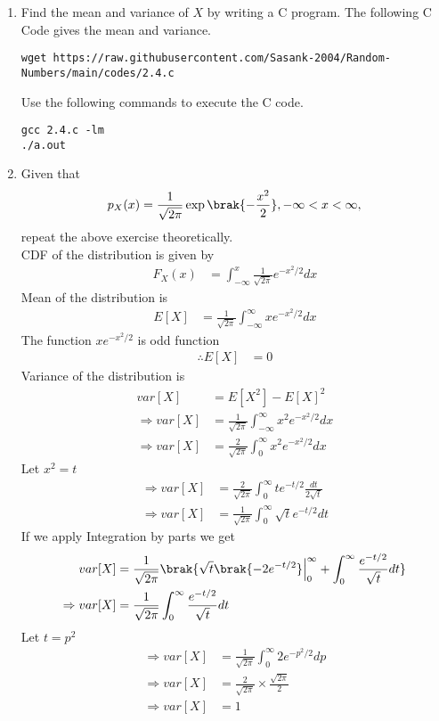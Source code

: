 \documentclass[journal,12pt,twocolumn]{IEEEtran}
\renewcommand\thesection{\arabic{section}}
\begin{document}
\begin{enumerate}[label=\thesection.\arabic*
,ref=\thesection.\theenumi]
\item Find the mean and variance of $X$ by writing a C program.
\solution The following C Code gives the mean and variance. 
\begin{lstlisting}
wget https://raw.githubusercontent.com/Sasank-2004/Random-Numbers/main/codes/2.4.c
\end{lstlisting}
Use the following commands to execute the C code.
\begin{lstlisting}
gcc 2.4.c -lm
./a.out
\end{lstlisting}
\item Given that 
\begin{align}
p_{X}(x) = \frac{1}{\sqrt{2\pi}}\exp\brak{-\frac{x^2}{2}}, -\infty < x < \infty,
\end{align}
repeat the above exercise theoretically.\\
%
\solution CDF of the distribution is given by 
\begin{align}
    F_X(x)  &=  \int_{-\infty}^{x} \frac{1}{\sqrt{2\pi}} e^{-x^2/2} dx
\end{align}
Mean of the distribution is 
\begin{align}
    E[X] &= \frac{1}{\sqrt{2\pi}}\int_{-\infty}^{\infty} xe^{-x^2/2} dx 
\end{align}
The function $xe^{-x^2/2}$ is odd function 
\begin{align}
    \therefore E[X] &= 0
\end{align}
Variance of the distribution is 
\begin{align}
    var[X] &= E[X^2] - E[X]^2 \\
    \Rightarrow var[X] &= \frac{1}{\sqrt{2\pi}}\int_{-\infty}^{\infty} x^2e^{-x^2/2} dx \\
    \Rightarrow var[X] &= \frac{2}{\sqrt{2\pi}}\int_{0}^{\infty} x^2e^{-x^2/2} dx
\end{align}
Let $x^2 = t$
\begin{align}
    \Rightarrow var[X] &= \frac{2}{\sqrt{2\pi}} \int_{0}^{\infty} t e^{-t/2} \frac{dt}{2\sqrt{t}} \\ 
    \Rightarrow var[X] &= \frac{1}{\sqrt{2\pi}} \int_{0}^{\infty} \sqrt{t} e^{-t/2} dt
\end{align}
If we apply Integration by parts we get 
\begin{align}
    var[X] &= \frac{1}{\sqrt{2\pi}} \brak{ \sqrt{t}\brak{-2e^{-t/2}}\Bigr|_{0}^{\infty} + \int_{0}^{\infty} \frac{e^{-t/2}}{\sqrt{t}} dt } \\
    \Rightarrow var[X] &= \frac{1}{\sqrt{2\pi}} \int_{0}^{\infty} \frac{e^{-t/2}}{\sqrt{t}} dt
\end{align}
Let $t=p^2$
\begin{align}
    \Rightarrow var[X] &= \frac{1}{\sqrt{2\pi}} \int_{0}^{\infty} 2e^{-p^2/2} dp \\
    \Rightarrow var[X] &= \frac{2}{\sqrt{2\pi}} \times \frac{\sqrt{2\pi}}{2} \\
    \Rightarrow var[X] &= 1
\end{align}
\end{enumerate}
\end{document}
